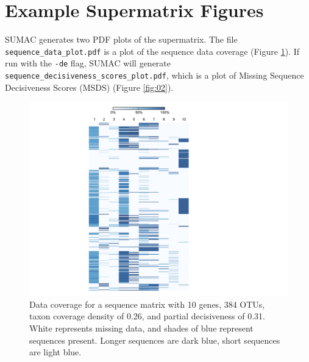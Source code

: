 \documentclass[10pt]{report}
\begin{document}
\section{Example Supermatrix Figures}

SUMAC generates two PDF plots of the supermatrix. The file \texttt{sequence\_data\_plot.pdf} is a plot of the sequence data coverage (Figure \ref{fig:01}). 
If run with the \texttt{-de} flag, SUMAC will generate \texttt{sequence\_decisiveness\_scores\_plot.pdf}, which is a plot of 
Missing Sequence Decisiveness Scores (MSDS) (Figure \ref{fig:02}).

\begin{figure}[!tpb]
\centerline{\includegraphics[scale=1.0]{figures/sequence_plot.pdf}}
\caption{Data coverage for a sequence matrix with 10 genes, 384 OTUs, taxon coverage density of 0.26, and partial decisiveness of 0.31.
White represents missing data, and shades of blue represent sequences present. Longer sequences are dark blue, short sequences
are light blue.} \label{fig:01}
\end{figure}
\end{document}
